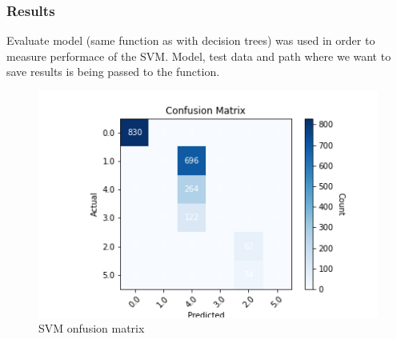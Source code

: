 \subsubsection{Results}

Evaluate model (same function as with decision trees) was used in order to measure performace of the SVM. Model, test data and path where we want to save results is being passed to the function.
\begin{figure}[H]
    \includegraphics[scale=0.85]{img/Model/Classification/SVM/confusion_matrix.png}
    \centering
    \caption{SVM onfusion matrix}
    \label{fig:SVM_confusion_matrix}
\end{figure}

